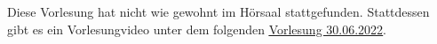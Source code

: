 Diese Vorlesung hat nicht wie gewohnt im Hörsaal stattgefunden. 
Stattdessen gibt es ein Vorlesungvideo unter dem folgenden 
\href{https://ls2-web.cs.tu-dortmund.de/~mamicoja/dap2/videos/lec_redblack.mp4}{\underline{Vorlesung 30.06.2022}}.